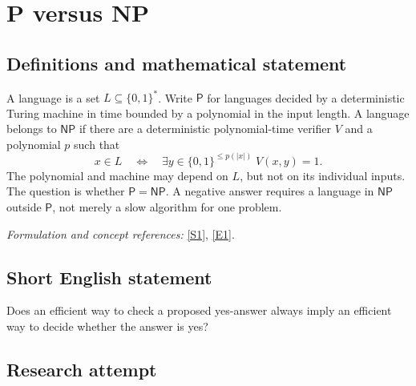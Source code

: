 \documentclass[11pt]{article}
\newcommand{\sref}[2]{\hyperlink{source:#1:#2}{[S#2]}}
\newcommand{\eref}[2]{\hyperlink{extra:#1:#2}{[E#2]}}
\newif\ifshowcatalogue
\newcommand{\cataloguescope}[1]{\ifshowcatalogue
 \paragraph{Exact scope in the supplied catalogue.}
 \begin{quote}\small #1\end{quote}\fi}
\begin{document}
\setcounter{section}{0}
\clearpage
\section{\texorpdfstring{P versus NP}{P versus NP}}\label{1}
\subsection{Definitions and mathematical statement}
A language is a set $L\subseteq\{0,1\}^*$. Write $\mathsf P$ for languages decided by a deterministic Turing machine in time bounded by a polynomial in the input length. A language belongs to $\mathsf{NP}$ if there are a deterministic polynomial-time verifier $V$ and a polynomial $p$ such that
\[
 x\in L\quad\Longleftrightarrow\quad \exists y\in\{0,1\}^{\le p(|x|)}\;V(x,y)=1.
\]
The polynomial and machine may depend on $L$, but not on its individual inputs. The question is whether $\mathsf P=\mathsf{NP}$. A negative answer requires a language in $\mathsf{NP}$ outside $\mathsf P$, not merely a slow algorithm for one problem.
\par\smallskip\textit{Formulation and concept references:} \sref{1}{1}, \eref{1}{1}.
\cataloguescope{Determine whether P = NP, that is, whether every decision problem whose solutions can be verified in polynomial time by a deterministic Turing machine can also be solved in polynomial time by a deterministic Turing machine.}
\subsection{Short English statement}
Does an efficient way to check a proposed yes-answer always imply an efficient way to decide whether the answer is yes?
\subsection{Research attempt}
\end{document}

